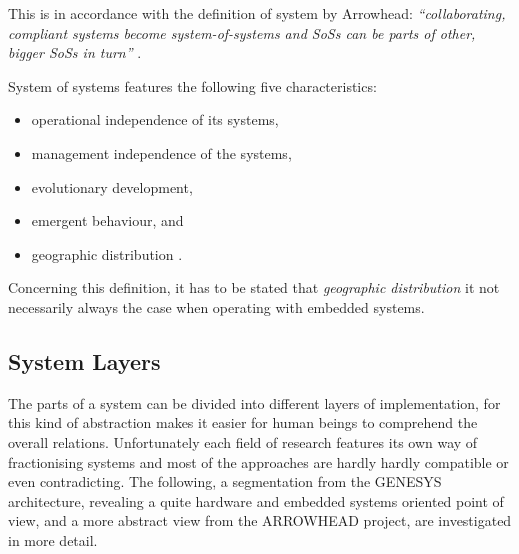 This is in accordance with the definition of system by Arrowhead: \emph{``collaborating, compliant systems become system-of-systems and SoSs can be parts of other, bigger SoSs in turn''} \cite{arrowhead_inpr}. 

System of systems features the following five characteristics:
\begin{itemize}
\item operational independence of its systems,
\item management independence of the systems,
\item evolutionary development,
\item emergent behaviour, and
\item geographic distribution \cite{arrowhead_inpr}.
\end{itemize}
Concerning this definition, it has to be stated that \emph{geographic distribution} it not necessarily always the case when operating with embedded systems.


\subsection{System Layers}
\label{ch:system_layers}
The parts of a system can be divided into different layers of implementation, for this kind of abstraction makes it easier for human beings to comprehend the overall relations. Unfortunately each field of research features its own way of fractionising systems and most of the approaches are hardly hardly compatible or even contradicting. The following, a segmentation from the GENESYS architecture, revealing a quite hardware and embedded systems oriented point of view, and a more abstract view from the ARROWHEAD project, are investigated in more detail.

